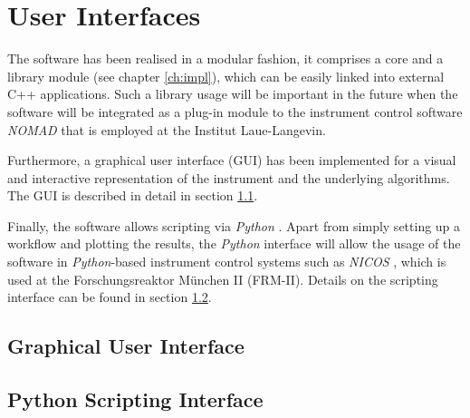 %
%

\chapter{User Interfaces}
\label{ch:gui}

The software has been realised in a modular fashion, it comprises a core
and a library module (see chapter \ref{ch:impl}), which can be easily linked 
into external C++ applications. Such a library usage will be important in the
future when the software will be integrated as a plug-in module to the instrument
control software \textit{NOMAD} \cite{web_NOMAD} that is employed at the Institut 
Laue-Langevin.

Furthermore, a graphical user interface (GUI) has been implemented for a visual
and interactive representation of the instrument and the underlying algorithms.
The GUI is described in detail in section \ref{sec:gui}.

Finally, the software allows scripting via \textit{Python} \cite{Rossum2011, web_python}. 
Apart from simply setting up a workflow and plotting the results, the \textit{Python}
interface will allow the usage of the software in \textit{Python}-based instrument
control systems such as \textit{NICOS} \cite{web_NICOS}, which is used at the 
Forschungsreaktor M\"unchen II (FRM-II). 
Details on the scripting interface can be found in section \ref{sec:scripting}.





\section{Graphical User Interface}
\label{sec:gui}






\section{Python Scripting Interface}
\label{sec:scripting}

